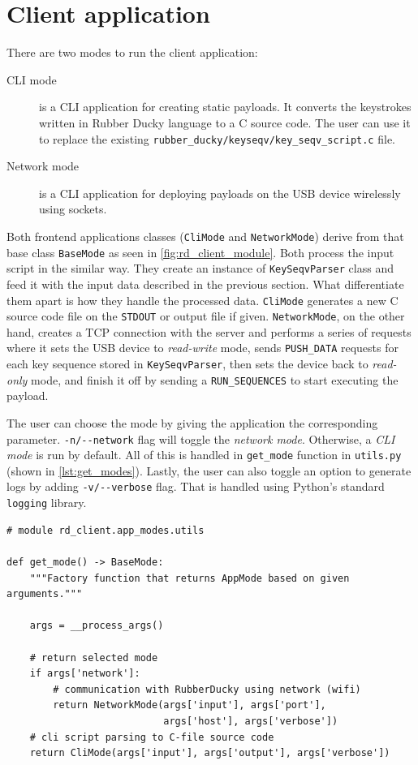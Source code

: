 \section{Client application}
\label{sec:implementation_client}
There are two modes to run the client application:
\begin{description}
    \item [CLI mode] is a CLI application for creating static payloads. It converts the keystrokes written in Rubber Ducky language to a C source code. The user can use it to replace the existing \verb|rubber_ducky/keyseqv/key_seqv_script.c| file.
    \item [Network mode] is a CLI application for deploying payloads on the USB device wirelessly using sockets.
\end{description}
Both frontend applications classes (\verb|CliMode| and \verb|NetworkMode|) derive from that base class \verb|BaseMode| as seen in \autoref{fig:rd_client_module}. Both process the input script in the similar way. They create an instance of \verb|KeySeqvParser| class and feed it with the input data described in the previous section. What differentiate them apart is how they handle the processed data. \verb|CliMode| generates a new C source code file on the \verb|STDOUT| or output file if given. \verb|NetworkMode|, on the other hand, creates a TCP connection with the server and performs a series of requests where it sets the USB device to \emph{read-write} mode, sends \verb|PUSH_DATA| requests for each key sequence stored in \verb|KeySeqvParser|, then sets the device back to \emph{read-only} mode, and finish it off by sending a \verb|RUN_SEQUENCES| to start executing the payload.

The user can choose the mode by giving the application the corresponding parameter. \verb|-n/--network| flag will toggle the \emph{network mode}. Otherwise, a \emph{CLI mode} is run by default. All of this is handled in \verb|get_mode| function in \verb|utils.py| (shown in \autoref{lst:get_modes}). Lastly, the user can also toggle an option to generate logs by adding \verb|-v/--verbose| flag. That is handled using Python's standard \verb|logging| library.

\begin{lstlisting}
# module rd_client.app_modes.utils

def get_mode() -> BaseMode:
    """Factory function that returns AppMode based on given arguments."""

    args = __process_args()

    # return selected mode
    if args['network']:
        # communication with RubberDucky using network (wifi)
        return NetworkMode(args['input'], args['port'],
                           args['host'], args['verbose'])
    # cli script parsing to C-file source code
    return CliMode(args['input'], args['output'], args['verbose'])
\end{lstlisting}

